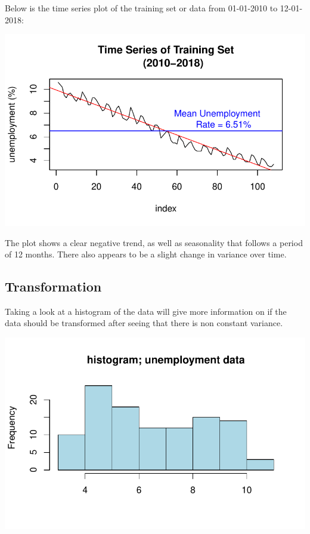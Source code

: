 \documentclass[
  letterpaper,
  DIV=11,
  numbers=noendperiod]{scrartcl}
\begin{document}
Below is the time series plot of the training set or data from
01-01-2010 to 12-01-2018:

\includegraphics{Final_Project_files/figure-pdf/unnamed-chunk-4-1.pdf}

The plot shows a clear negative trend, as well as seasonality that
follows a period of 12 months. There also appears to be a slight change
in variance over time.

\hypertarget{transformation}{%
\subsection{Transformation}\label{transformation}}

Taking a look at a histogram of the data will give more information on
if the data should be transformed after seeing that there is non
constant variance.

\includegraphics{Final_Project_files/figure-pdf/unnamed-chunk-5-1.pdf}
\end{document}
